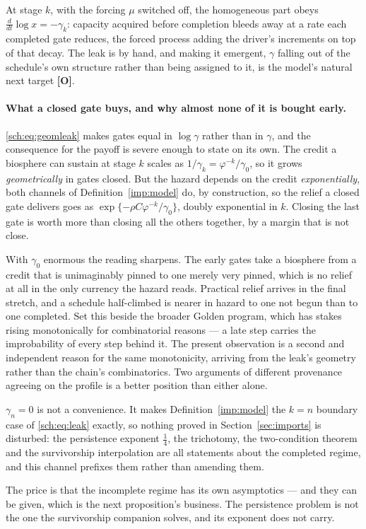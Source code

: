 At stage $k$, with the forcing $\mu$ switched off, the homogeneous part
obeys $\tfrac{d}{dt}\log x=-\gamma_k$: capacity acquired before
completion bleeds away at a rate each completed gate reduces, the
forced process adding the driver's increments on top of that decay. The leak is by hand, and making it emergent, $\gamma$
falling out of the schedule's own structure rather than being assigned
to it, is the model's natural next target \textbf{[O]}.

\paragraph{What a closed gate buys, and why almost none of it is
bought early.}\label{sch:rem:backloaded}
\eqref{sch:eq:geomleak} makes gates equal in $\log\gamma$ rather than in
$\gamma$, and the consequence for the payoff is severe enough to state
on its own. The credit a biosphere can sustain at stage $k$ scales as
$1/\gamma_k=\varphi^{-k}/\gamma_0$, so it grows \emph{geometrically} in
gates closed. But the hazard depends on the credit \emph{exponentially}, both channels of Definition~\ref{imp:model} do, by construction, so the
relief a closed gate delivers goes as
$\exp\{-\rho C\varphi^{-k}/\gamma_0\}$, doubly exponential in $k$.
Closing the last gate is worth more than closing all the others
together, by a margin that is not close.

With $\gamma_0$ enormous the reading sharpens. The early gates take a
biosphere from a credit that is unimaginably pinned to one merely very
pinned, which is no relief at all in the only currency the hazard reads.
Practical relief arrives in the final stretch, and a schedule
half-climbed is nearer in hazard to one not begun than to one completed. Set this beside the broader Golden program, which has stakes rising
monotonically for combinatorial reasons --- a late step carries the
improbability of every step behind it. The present observation is a
second and independent reason for the same monotonicity, arriving from
the leak's geometry rather than the chain's combinatorics. Two arguments
of different provenance agreeing on the profile is a better position
than either alone.

\begin{remark}
\label{sch:rem:limit}
$\gamma_n=0$ is not a convenience. It makes
Definition~\ref{imp:model} the $k=n$ boundary case of
\eqref{sch:eq:leak} exactly, so nothing proved in
Section~\ref{sec:imports} is disturbed: the
persistence exponent $\tfrac14$, the trichotomy, the two-condition
theorem and the survivorship interpolation are all statements about the
completed regime, and this channel prefixes them rather than amending
them.

The price is that the incomplete regime has its own asymptotics --- and
they can be given, which is the next proposition's business. The
persistence problem is not the one the survivorship companion \cite{GoldenSurvivorship} solves, and
its exponent does not carry.
\end{remark}

